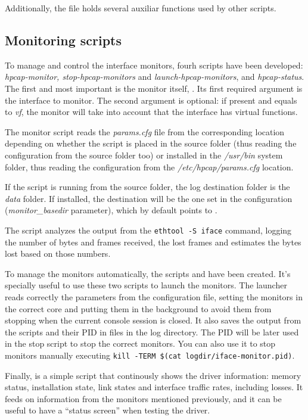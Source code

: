 \documentclass[oneside]{hpman}
\begin{document}
Additionally, the  file holds several auxiliar functions used by other scripts.

\subsection{Monitoring scripts}
\label{sec:scripts:monitoring}

To manage and control the interface monitors, fourh scripts have been developed: \textit{hpcap-monitor, stop-hpcap-monitors} and \textit{launch-hpcap-monitors}, and \textit{hpcap-status}. The first and most important is the monitor itself, . Its first required argument is the interface to monitor. The second argument is optional: if present and equals to \textit{vf}, the monitor will take into account that the interface has virtual functions.

The monitor script reads the \textit{params.cfg} file from the corresponding location depending on whether the script is placed in the source folder (thus reading the configuration from the source folder too) or installed in the \textit{/usr/bin} system folder, thus reading the configuration from the \textit{/etc/hpcap/params.cfg} location.

If the script is running from the source folder, the log destination folder is the \textit{data} folder. If installed, the destination will be the one set in the configuration (\textit{monitor\_basedir} parameter), which by default points to .

The script analyzes the output from the \texttt{ethtool -S iface} command, logging the number of bytes and frames received, the lost frames and estimates the bytes lost based on those numbers.

To manage the monitors automatically, the scripts  and  have been created. It's specially useful to use these two scripts to launch the monitors. The launcher reads correctly the parameters from the configuration file, setting the monitors in the correct core and putting them in the background to avoid them from stopping when the current console session is closed. It also saves the output from the scripts and their PID in files in the log directory. The PID will be later used in the stop script to stop the correct monitors. You can also use it to stop monitors manually executing \texttt{kill -TERM \$(cat logdir/iface-monitor.pid)}.

Finally,  is a simple script that continously shows the driver information: memory status, installation state, link states and interface traffic rates, including losses. It feeds on information from the monitors mentioned previously, and it can be useful to have a ``status screen'' when testing the driver.
\end{document}
